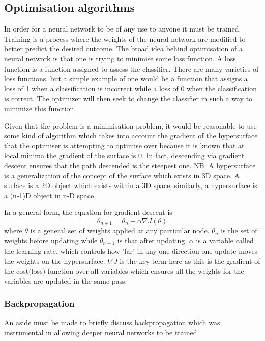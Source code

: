 \documentclass[a4paper,fleqn,usenatbib]{mnras}
\begin{document}
\subsection{Optimisation algorithms}
In order for a neural network to be of any use to anyone it must be trained. Training is a process where the weights of the neural network are modified to better predict the desired outcome. The broad idea behind optimisation of a neural network is that one is trying to minimise some loss function. A loss function is a function assigned to assess the classifier. There are many varieties of loss functions, but a simple example of one would be a function that assigns a loss of 1 when a classification is incorrect while a loss of 0 when the classification is correct. The optimizer will then seek to change the classifier in such a way to minimize this function. 

Given that the problem is a minimisation problem, it would be reasonable to use some kind of algorithm which takes into account the gradient of the hypersurface that the optimiser is attempting to optimise over because it is known that at local minima the gradient of the surface is 0. In fact, descending via gradient descent ensures that the path descended is the steepest one. \citep{Gradient Descent} NB: A hypersurface is a generalization of the concept of the surface which exists in 3D space. A surface is a 2D object which exists within a 3D space, similarly, a hypersurface is a (n-1)D object in n-D space. 

In a general form, the equation for gradient descent is 
\begin{equation}
\theta_{n+1}=\theta_{n}-\alpha\nabla J(\theta)	
\end{equation}
where $\theta$ is a general set of weights applied at any particular node. $\theta_{n}$ is the set of weights before updating while $\theta_{n+1}$ is that after updating. $\alpha$ is a variable called the learning rate, which controls how 'far' in any one direction one update moves the weights on the hypersurface. $\nabla J$ is the key term here as this is the gradient of the cost(loss) function over all variables which ensures all the weights for the variables are updated in the same pass. \citep{GradientDescent}

\subsubsection{Backpropagation}
\label{sec:BP}
An aside must be made to briefly discuss backpropagation which was instrumental in allowing deeper neural networks to be trained. 
\end{document}
